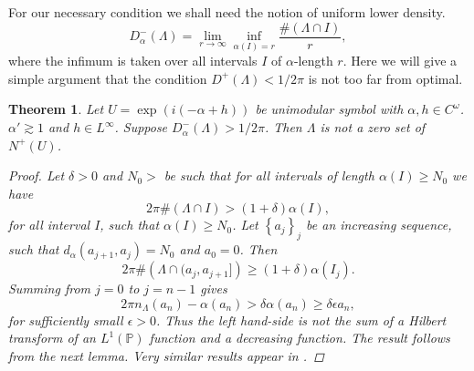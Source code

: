 \documentclass{article}[12pt]
\newtheorem{theorem}{Theorem}
\theoremstyle{remark}
\begin{document}
    For our necessary condition we shall need the notion of uniform lower density.
    \begin{equation*}
        D_{\alpha}^{-}(\Lambda) = \lim_{r \to \infty}\inf_{\alpha(I) = r} \frac{\#(\Lambda \cap I)}{r},
    \end{equation*}
    where the infimum is taken over all intervals $I$ of $\alpha$-length $r$. Here we will give a simple argument that the condition $D^{+}(\Lambda) < 1/2 \pi$ is not too far from optimal.
    \begin{theorem}
        Let $U = \exp(i(-\alpha+h))$ be unimodular symbol with $\alpha,  h\in C^{\omega}$. $\alpha'  \gtrsim 1$ and $h \in L^{\infty}$. Suppose $D^{-}_{\alpha}(\Lambda) > 1/2\pi$. Then $\Lambda$ is not a zero set of $N^{+}(U)$.
        \begin{proof}
            Let $\delta > 0$ and $N_{0} > $ be such that for all intervals of length $\alpha(I) \geq N_{0}$ we have
            \begin{equation*}
                2\pi\# \left( \Lambda \cap I \right) > (1+\delta)\alpha(I),
            \end{equation*}
            for all interval $I$, such that $\alpha(I) \geq N_{0}$. Let $\left\{a_{j} \right\}_{j}$ be an increasing sequence, such that $d_{\alpha}(a_{j+1},a_{j}) = N_{0}$ and $a_{0} = 0$. Then
            \begin{equation*}
                2\pi \#\left( \Lambda \cap (a_{j},a_{j+1}]\right) \geq (1+\delta)\alpha(I_{j}).
            \end{equation*}
            Summing from $j = 0$ to $j = n-1$ gives
            \begin{equation*}
                2\pi n_{\Lambda}(a_{n}) - \alpha(a_{n}) > \delta\alpha(a_{n}) \geq \delta\epsilon a_{n},
            \end{equation*}
            for sufficiently small $\epsilon > 0$. Thus the left hand-side is not the sum of a Hilbert transform of an $L^{1}(\mathbb{P})$ function and a decreasing function. The result follows from the next lemma. Very similar results appear in \cite{MR2215727}.
        \end{proof}
    \end{theorem}
\end{document}
